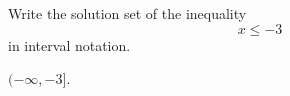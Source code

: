 
Write the solution set of the inequality
\[x\leq -3\]
in interval notation.

\begin{solution}
$(-\infty, -3]$.
\end{solution}
